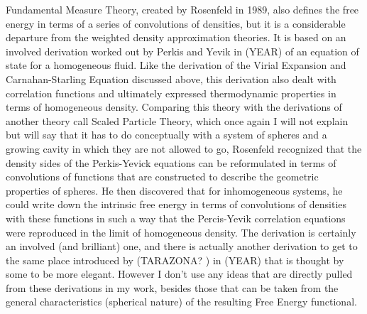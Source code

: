 Fundamental Measure Theory, created by Rosenfeld in 1989, also defines
the free energy in terms of a series of convolutions of densities, but
it is a considerable departure from the weighted density approximation
theories.  It is based on an involved derivation worked out by Perkis
and Yevik in (YEAR) of an equation of state for a homogeneous fluid.
Like the derivation of the Virial Expansion and Carnahan-Starling
Equation discussed above, this derivation also dealt with correlation
functions and ultimately expressed thermodynamic properties in terms
of homogeneous density.  Comparing this theory with the derivations of
another theory call Scaled Particle Theory, which once again I will
not explain but will say that it has to do conceptually with a system
of spheres and a growing cavity in which they are not allowed to go,
Rosenfeld recognized that the density sides of the Perkis-Yevick
equations can be reformulated in terms of convolutions of functions
that are constructed to describe the geometric properties of spheres.
He then discovered that for inhomogeneous systems, he could write down
the intrinsic free energy in terms of convolutions of densities with
these functions in such a way that the Percis-Yevik correlation
equations were reproduced in the limit of homogeneous density.  The
derivation is certainly an involved (and brilliant) one, and there is
actually another derivation to get to the same place introduced by
(TARAZONA? ) in (YEAR) that is thought by some to be more elegant.
However I don't use any ideas that are directly pulled from these
derivations in my work, besides those that can be taken from the
general characteristics (spherical nature) of the resulting Free
Energy functional.

